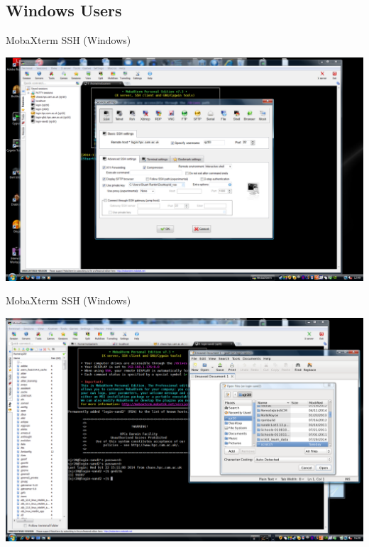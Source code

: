 \subsection{Windows Users}
\begin{frame}{MobaXterm SSH (Windows)}
\begin{center}
\centerline{\includegraphics[height=0.8\textheight]{imgs/mobaxterm-SSH-settings2.png}}
\end{center}
\end{frame}

\begin{frame}{MobaXterm SSH (Windows)}
\begin{center}
\centerline{\includegraphics[height=0.8\textheight]{imgs/mobaxterm-SSH-session.png}}
\end{center}
\end{frame}

